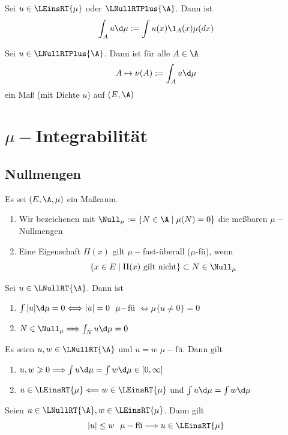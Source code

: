 \documentclass[11pt, a4paper]{article}
\begin{document}
\begin{definition} Sei $u\in \LEinsRT{\mu}$ oder $\LNullRTPlus{\A}$. Dann ist
$$\int_A u \d\mu := \int u(x)\1_A(x) \mu(dx)$$
\end{definition}

\begin{lemma}
Sei $u\in \LNullRTPlus{\A}$. Dann ist für alle $A\in \A$
$$A\mapsto \nu(A):= \int_A u \d\mu$$
ein Maß (mit Dichte $u$) auf $(E,\A)$
\end{lemma}
\newpage
\section{$\mu-$Integrabilität}

\subsection{Nullmengen}

\begin{definition} Es sei $(E,\A, \mu)$ ein Maßraum. 
\begin{enumerate}
    \item Wir bezeichenen mit $\Null_\mu :=\{N\in \A \mid \mu (N) = 0\}$ die meßbaren $\mu-$Nullmengen 
    \item Eine Eigenschaft $\Pi(x)$ gilt $\mu-$fast-überall ($\mu$-fü), wenn $$\{x\in E\mid \Pi(x) \text{ gilt nicht}\}\subset N\in \Null_\mu$$
\end{enumerate}
\end{definition}

\begin{theorem} Sei $u\in \LNullRT{\A}$. Dann ist 
\begin{enumerate}[label=\alph*)]
    \item $\int|u|\d\mu = 0 \Longleftrightarrow |u| = 0 \ \ \mu-$fü $\Longleftrightarrow \mu\{u\neq 0\}=0$
    \item $N\in \Null_\mu \Longrightarrow \int_N u\d\mu = 0$
\end{enumerate}
\end{theorem}

\begin{corollary}
    Es seien $u,w\in \LNullRT{\A}$ und $u=w$ $\mu-$fü. Dann gilt
    \begin{enumerate}[label=\alph*)]
        \item $u,w\geqslant 0 \Longrightarrow \int u \d\mu = \int w \d\mu \in [0,\infty]$
        \item $u\in\LEinsRT{\mu}\Longleftarrow w\in \LEinsRT{\mu}$ und $\int u \d\mu = \int w \d\mu$
    \end{enumerate}
\end{corollary}
\begin{corollary}
Seien $u\in \LNullRT{\A}, w\in \LEinsRT{\mu}$. Dann gilt 
$$|u|\leq w \ \ \mu-\text{fü} \Longrightarrow u\in \LEinsRT{\mu}$$
\end{corollary}
\end{document}
